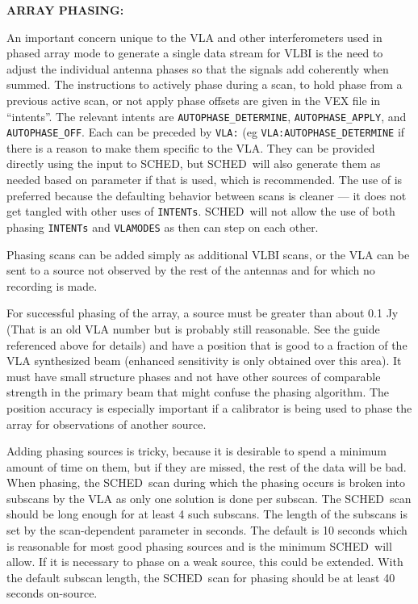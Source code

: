 \documentclass{report}
\newcommand{\sched}{{\sc SCHED}}
\newcommand{\schedb}{{\sc SCHED~}}
\begin{document}
{\bf ARRAY PHASING:}

An important concern unique to the VLA and other interferometers used
in phased array mode to generate a single data stream for VLBI is the
need to adjust the individual antenna phases so that the signals add
coherently when summed.  The instructions to actively phase during a
scan, to hold phase from a previous active scan, or not apply phase
offsets are given in the VEX file in ``intents''.  The relevant
intents are {\tt AUTOPHASE\_DETERMINE}, {\tt AUTOPHASE\_APPLY}, and
{\tt AUTOPHASE\_OFF}.  Each can be preceded by {\tt VLA:} (eg 
{\tt VLA:AUTOPHASE\_DETERMINE} if there is a reason to make them 
specific to the VLA.   They can be provided directly using the
 input to \sched, but \schedb will
also generate them as needed based on  parameter if that is used, which is recommended.
The use of  is preferred because
the defaulting behavior between scans is cleaner --- it does not get
tangled with other uses of {\tt INTENTs}.  \schedb will not allow the
use of both phasing {\tt INTENTs} and {\tt VLAMODES} as then can step
on each other.

Phasing scans can be added simply as additional VLBI scans, or the VLA
can be sent to a source not observed by the rest of the antennas and
for which no recording is made.

For successful phasing of the array, a source must be greater than
about 0.1 Jy (That is an old VLA number but is probably still
reasonable.  See the guide referenced above for details) and have a
position that is good to a fraction of the VLA synthesized beam
(enhanced sensitivity is only obtained over this area).  It must have
small structure phases and not have other sources of comparable
strength in the primary beam that might confuse the phasing algorithm.
The position accuracy is especially important if a calibrator is being
used to phase the array for observations of another source.  

Adding phasing sources is tricky, because it is desirable to spend a
minimum amount of time on them, but if they are missed, the rest of
the data will be bad.  When phasing, the \schedb scan during which the
phasing occurs is broken into subscans by the VLA as only one solution
is done per subscan.  The \schedb scan should be long enough for at
least 4 such subscans.  The length of the subscans is set by the
scan-dependent parameter  in
seconds.  The default is 10 seconds which is reasonable for most good
phasing sources and is the minimum \schedb will allow.  If it is
necessary to phase on a weak source, this could be extended.  With the
default subscan length, the \schedb scan for phasing should be at
least 40 seconds on-source.
\end{document}
